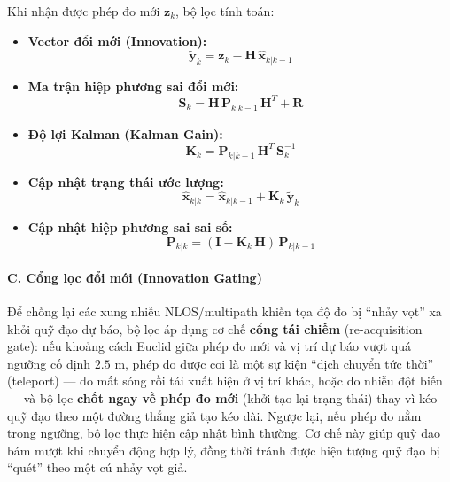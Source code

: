 Khi nhận được phép đo mới $\mathbf{z}_k$, bộ lọc tính toán:
\begin{itemize}
    \item \textbf{Vector đổi mới (Innovation):}
    \begin{equation}
        \tilde{\mathbf{y}}_k = \mathbf{z}_k - \mathbf{H}\, \hat{\mathbf{x}}_{k|k-1}
    \end{equation}
    \item \textbf{Ma trận hiệp phương sai đổi mới:}
    \begin{equation}
        \mathbf{S}_k = \mathbf{H}\, \mathbf{P}_{k|k-1}\, \mathbf{H}^T + \mathbf{R}
    \end{equation}
    \item \textbf{Độ lợi Kalman (Kalman Gain):}
    \begin{equation}
        \mathbf{K}_k = \mathbf{P}_{k|k-1}\, \mathbf{H}^T\, \mathbf{S}_k^{-1}
    \end{equation}
    \item \textbf{Cập nhật trạng thái ước lượng:}
    \begin{equation}
        \hat{\mathbf{x}}_{k|k} = \hat{\mathbf{x}}_{k|k-1} + \mathbf{K}_k\, \tilde{\mathbf{y}}_k
    \end{equation}
    \item \textbf{Cập nhật hiệp phương sai sai số:}
    \begin{equation}
        \mathbf{P}_{k|k} = (\mathbf{I} - \mathbf{K}_k\, \mathbf{H})\, \mathbf{P}_{k|k-1}
    \end{equation}
\end{itemize}

\paragraph*{C. Cổng lọc đổi mới (Innovation Gating)}

Để chống lại các xung nhiễu NLOS/multipath khiến tọa độ đo bị ``nhảy vọt'' xa khỏi quỹ đạo dự báo, bộ lọc áp dụng cơ chế \textbf{cổng tái chiếm} (re-acquisition gate): nếu khoảng cách Euclid giữa phép đo mới và vị trí dự báo vượt quá ngưỡng cố định $2.5$ m, phép đo được coi là một sự kiện ``dịch chuyển tức thời'' (teleport) --- do mất sóng rồi tái xuất hiện ở vị trí khác, hoặc do nhiễu đột biến --- và bộ lọc \textbf{chốt ngay về phép đo mới} (khởi tạo lại trạng thái) thay vì kéo quỹ đạo theo một đường thẳng giả tạo kéo dài. Ngược lại, nếu phép đo nằm trong ngưỡng, bộ lọc thực hiện cập nhật bình thường. Cơ chế này giúp quỹ đạo bám mượt khi chuyển động hợp lý, đồng thời tránh được hiện tượng quỹ đạo bị ``quét'' theo một cú nhảy vọt giả.

